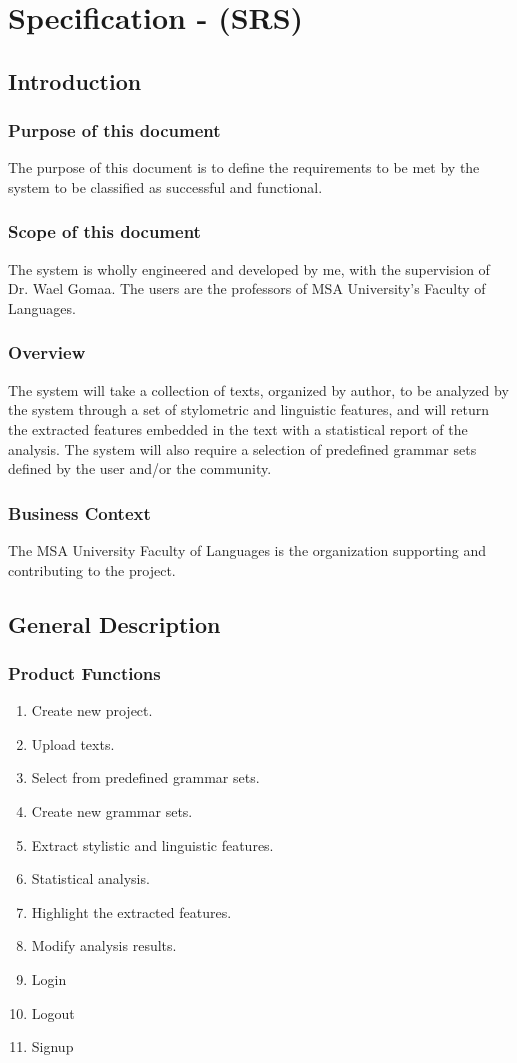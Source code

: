 \chapter{Specification - (SRS)}

\section{Introduction}
\subsection{Purpose of this document}
The purpose of this document is to define the requirements to be met by the system to be classified as successful and functional.

\subsection{Scope of this document}
The system is wholly engineered and developed by me, with the supervision of Dr. Wael Gomaa. The users are the professors of MSA University's Faculty of Languages.

\subsection{Overview}
The system will take a collection of texts, organized by author, to be analyzed by the system through a set of stylometric and linguistic features, and will return the extracted features embedded in the text with a statistical report of the analysis. The system will also require a selection of predefined grammar sets defined by the user and/or the community.

\subsection{Business Context}
The MSA University Faculty of Languages is the organization supporting and contributing to the project.

\section{General Description}
\subsection{Product Functions}
\begin{enumerate}
    \item Create new project.
    \item Upload texts.
    \item Select from predefined grammar sets.
    \item Create new grammar sets.
    \item Extract stylistic and linguistic features.
    \item Statistical analysis.
    \item Highlight the extracted features.
    \item Modify analysis results.
    \item Login
    \item Logout
    \item Signup
\end{enumerate}

